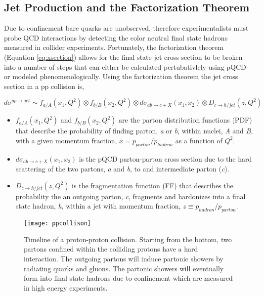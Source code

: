 \subsection{Jet Production and the Factorization Theorem}

Due to confinement bare quarks are unobserved, therefore experimentalists must probe QCD interactions by detecting the color neutral final state hadrons measured in collider experiments.  Fortunately, the factorization theorem (Equation \ref{eq:xsection}) allows for the final state jet cross section to be broken into a number of steps that can either be calculated pertubativlely using pQCD or modeled phenomenologically.  Using the factorization theorem the jet cross section in a pp collision is,


\begin{equation}
d\sigma^{pp \rightarrow jet} \sim f_{a/A}(x_{1},Q^{2}) \otimes  f_{b/B}(x_{2},Q^{2}) \otimes d\sigma_{ab \rightarrow c + X} (x_{1},x_{2}) \otimes D_{c \rightarrow h/jet}(z,Q^{2})
\label{eq:xsection}
\end{equation}

\noindent
\begin{itemize}
\item  $ f_{a/A}(x_{1},Q^{2})$ and $ f_{b/B}(x_{2},Q^{2})$ are the parton distribution functions (PDF) that describe the probability of finding parton, \textit{a} or \textit{b}, within nuclei, \textit{A} and \textit{B}, with a given momentum fraction, $x = p_{parton} / p_{hadron} $ as a function of $Q^{2}$.
\item  $d\sigma_{ab \rightarrow c + X} (x_{1},x_{2})$ is the pQCD parton-parton cross section due to the hard scattering of the two partons, \textit{a} and \textit{b}, to and intermediate parton (\textit{c}).
\item   $ D_{c \rightarrow h/jet}(z,Q^{2})$ is the fragmentation function (FF) that describes the probability the an outgoing parton, \textit{c}, fragments and hardonizes into a final state hadron, \textit{h}, within a jet with momentum fraction, $z \equiv p_{hadron} / p_{parton}$.
\end{itemize}

\begin{figure}[h]
\texttt{[image: ppcollison]}
\centering
\caption{Timeline of a proton-proton collision.  Starting from the bottom, two partons confined within the colliding protons have a hard interaction.  The outgoing partons will induce partonic showers by radiating quarks and gluons.  The partonic showers will eventually form into final state hadrons due to confinement which are measured in high energy experiments\cite{Dobbs:2001ck}.}
\label{fig:FactorizationCartoon}
\end{figure}

